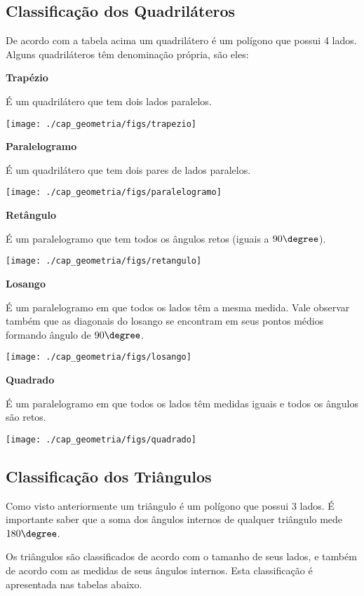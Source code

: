 \newpage
\subsection{Classificação dos Quadriláteros}

De acordo com a tabela acima um quadrilátero é um polígono que possui 4 lados. Alguns quadriláteros têm denominação própria, são eles:

\textbf{Trapézio}

É um quadrilátero que tem dois lados paralelos.

\texttt{[image: ./cap\_geometria/figs/trapezio]}


\textbf{Paralelogramo}

É um quadrilátero que tem dois pares de lados paralelos.

\texttt{[image: ./cap\_geometria/figs/paralelogramo]}


\textbf{Retângulo}

É um paralelogramo que tem todos os ângulos retos (iguais a $90\degree$).

\texttt{[image: ./cap\_geometria/figs/retangulo]}


\textbf{Losango}

É um paralelogramo em que todos os lados têm a mesma medida. Vale observar também que as diagonais do losango se encontram em seus pontos médios formando ângulo de $90\degree$.

\texttt{[image: ./cap\_geometria/figs/losango]}


\textbf{Quadrado}

É um paralelogramo em que todos os lados têm medidas iguais e todos os ângulos são retos.

\texttt{[image: ./cap\_geometria/figs/quadrado]}


\subsection{Classificação dos Triângulos}

Como visto anteriormente um triângulo é um polígono que possui 3 lados. É importante saber que a soma dos ângulos internos de qualquer triângulo mede $180\degree$.

Os triângulos são classificados de acordo com o tamanho de seus lados, e também de acordo com as medidas de seus ângulos internos. Esta classificação é apresentada nas tabelas abaixo.

